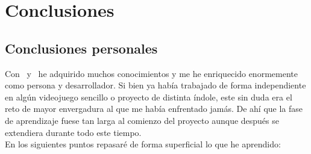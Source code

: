 \documentclass[a4paper,11pt]{article}
\begin{document}
\section{Conclusiones}

\subsection{Conclusiones personales}

\noindent Con \wiki\ y \juego\ he adquirido muchos conocimientos y me he
enriquecido enormemente como persona y desarrollador. Si bien ya había
trabajado de forma independiente en algún videojuego sencillo o proyecto
de distinta índole, este sin duda era el reto de mayor envergadura al que
me había enfrentado jamás. De ahí que la fase de aprendizaje fuese tan
larga al comienzo del proyecto aunque después se extendiera durante
todo este tiempo.\\

\noindent En los siguientes puntos repasaré de forma superficial lo que he aprendido:
\end{document}
